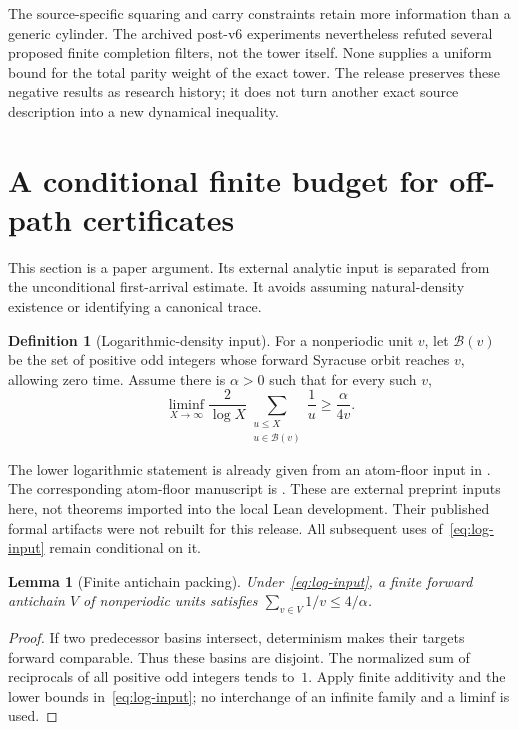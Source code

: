 \documentclass[11pt,a4paper]{article}
\newtheorem{lemma}[theorem]{Lemma}
\theoremstyle{definition}
\newtheorem{definition}[theorem]{Definition}
\begin{document}
The source-specific squaring and carry constraints retain more
information than a generic cylinder. The archived post-v6 experiments
nevertheless refuted several proposed finite completion filters, not
the tower itself. None supplies a uniform bound for the total parity
weight of the exact tower. The release preserves these negative
results as research history; it does not turn another exact source
description into a new dynamical inequality.

\section{A conditional finite budget for off-path certificates}
\label{sec:conditional-budget}
This section is a paper argument. Its external analytic input is
separated from the unconditional first-arrival estimate. It avoids
assuming natural-density existence or identifying a canonical trace.

\begin{definition}[Logarithmic-density input]\label{def:log-input}
For a nonperiodic unit $v$, let $\mathcal B(v)$ be the set of positive
odd integers whose forward Syracuse orbit reaches $v$, allowing
zero time. Assume there is $\alpha>0$ such that for every such $v$,
\begin{equation}\label{eq:log-input}
 \liminf_{X\to\infty}\frac{2}{\log X}
 \sum_{\substack{u\le X\\u\in\mathcal B(v)}}\frac1u
 \ge\frac{\alpha}{4v}.
\end{equation}
\end{definition}
The lower logarithmic statement is already given from an atom-floor
input in \cite[Section~2]{weaver12}. The corresponding atom-floor
manuscript is \cite{eljaouhari2026}. These are external preprint
inputs here, not theorems imported into the local Lean development.
Their published formal artifacts were not rebuilt for this release.
All subsequent uses of~\eqref{eq:log-input} remain conditional on it.

\begin{lemma}[Finite antichain packing]\label{lem:log-antichain}
Under~\eqref{eq:log-input}, a finite forward antichain $V$ of
nonperiodic units satisfies $\sum_{v\in V}1/v\le4/\alpha$.
\end{lemma}
\begin{proof}
If two predecessor basins intersect, determinism makes their targets
forward comparable. Thus these basins are disjoint. The normalized
sum of reciprocals of all positive odd integers tends to~$1$.
Apply finite additivity and the lower bounds in~\eqref{eq:log-input};
no interchange of an infinite family and a liminf is used.
\end{proof}
\end{document}
